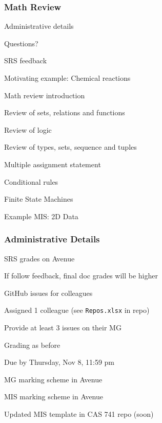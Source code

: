 \documentclass[t,12pt,numbers,fleqn]{beamer}
\begin{document}



\begin{frame}
\frametitle{Math Review}

\bi
\item Administrative details
\item Questions?
\item SRS feedback
\item Motivating example: Chemical reactions
\item Math review introduction
\item Review of sets, relations and functions
\item Review of logic
\item Review of types, sets, sequence and tuples
\item Multiple assignment statement
\item Conditional rules
\item Finite State Machines
\item Example MIS: 2D Data
\ei
\end{frame}


\begin{frame}
\frametitle{Administrative Details}

\bi
\item SRS grades on Avenue
\item If follow feedback, final doc grades will be higher
\item GitHub issues for colleagues
\bi
\item Assigned 1 colleague (see \texttt{Repos.xlsx} in repo)
\item Provide at least 3 issues on their MG
\item Grading as before
\item Due by Thursday, Nov 8, 11:59 pm
\ei
\item MG marking scheme in Avenue
\item MIS marking scheme in Avenue
\item Updated MIS template in CAS 741 repo (soon)
\ei

\end{frame}

\end{document}
